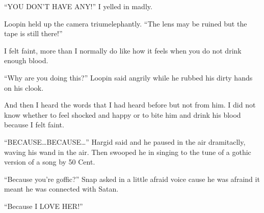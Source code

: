 \enquote{YOU DON'T HAVE ANY\@!} I yelled in madly.

Loopin held up the camera triumelephantly. \enquote{The lens may be ruined but the tape is still there!}

I felt faint, more than I normally do like how it feels when you do not drink enough blood.

\enquote{Why are you doing this?} Loopin said angrily while he rubbed his dirty hands on his clook.

And then I heard the words that I had heard before but not from him. I did not know whether to feel shocked and happy or to bite him and drink his blood because I felt faint.

\enquote{BECAUSE\ldots BECAUSE\ldots} Hargid said and he paused in the air dramitaclly, waving his wand in the air. Then swooped he in singing to the tune of a gothic version of a song by 50 Cent.

\enquote{Because you're goffic?} Snap asked in a little afraid voice cause he was afraind it meant he was connected with Satan.

\enquote{Because I LOVE HER\@!}
